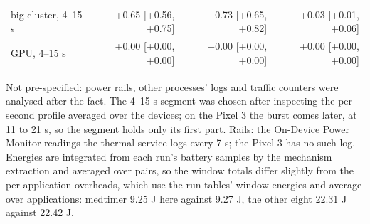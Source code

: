 \begin{table}[t]
\begin{tabular}{lrrr}
big cluster, 4--15 s & +0.65 [+0.56, +0.75] & +0.73 [+0.65, +0.82] & +0.03 [+0.01, +0.06] \\
GPU, 4--15 s & +0.00 [+0.00, +0.00] & +0.00 [+0.00, +0.00] & +0.00 [+0.00, +0.00] \\
\bottomrule
\end{tabular}
\par\smallskip\footnotesize Not pre-specified: power rails, other processes' logs and traffic counters were analysed after the fact. The 4--15 s segment was chosen after inspecting the per-second profile averaged over the devices; on the Pixel 3 the burst comes later, at 11 to 21 s, so the segment holds only its first part. Rails: the On-Device Power Monitor readings the thermal service logs every 7 s; the Pixel 3 has no such log. Energies are integrated from each run's battery samples by the mechanism extraction and averaged over pairs, so the window totals differ slightly from the per-application overheads, which use the run tables' window energies and average over applications: medtimer 9.25 J here against 9.27 J, the other eight 22.31 J against 22.42 J.
\end{table}
